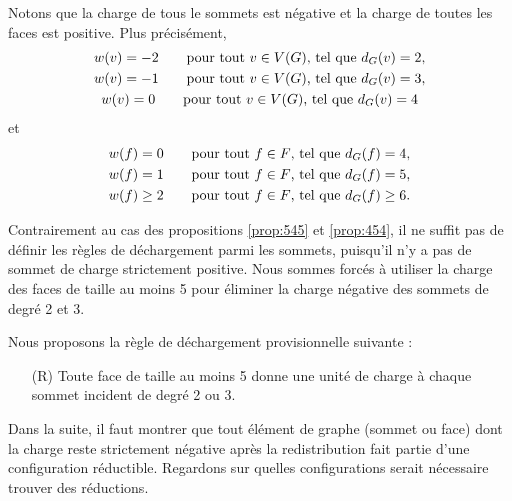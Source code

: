 \documentclass[10pt,a4paper]{article}
\begin{document}
Notons que la charge de tous le sommets est négative et la charge de toutes les faces est positive. Plus précisément, 
$$
\gathered
w(v) = -2 \qquad \textrm{pour tout $v \in V(G)$, tel que  } d_G(v) = 2,\\
w(v) = -1 \qquad \textrm{pour tout $v \in V(G)$, tel que  } d_G(v) = 3,\\
w(v) = 0 \qquad \textrm{pour tout $v \in V(G)$, tel que  } d_G(v) = 4
\endgathered
$$
et
$$
\gathered
w(f) = 0 \qquad \textrm{pour tout $f \in F$, tel que  } d_G(f) = 4,\\
w(f) = 1 \qquad \textrm{pour tout $f \in F$, tel que  } d_G(f) = 5,\\
w(f) \geq 2 \qquad \textrm{pour tout $f \in F$, tel que  } d_G(f) \geq 6.
\endgathered
$$


Contrairement au cas des propositions \ref{prop:545} et \ref{prop:454}, il ne suffit pas de définir les règles de déchargement parmi les sommets, puisqu'il n'y a pas de sommet de charge strictement positive. Nous sommes forcés à utiliser la charge des faces de taille au moins 5 pour éliminer la charge négative des sommets de degré 2 et 3.

Nous proposons la règle de déchargement provisionnelle suivante :

\begin{enumerate}
\item [(R)] Toute face de taille au moins 5 donne une unité de charge à chaque sommet incident de degré 2 ou 3.
\end{enumerate}

Dans la suite, il faut montrer que tout élément de graphe (sommet ou face) dont la charge reste strictement négative après la redistribution fait partie d'une configuration réductible. Regardons sur quelles configurations serait nécessaire trouver des réductions.

%
%
%
%
%
\end{document}
